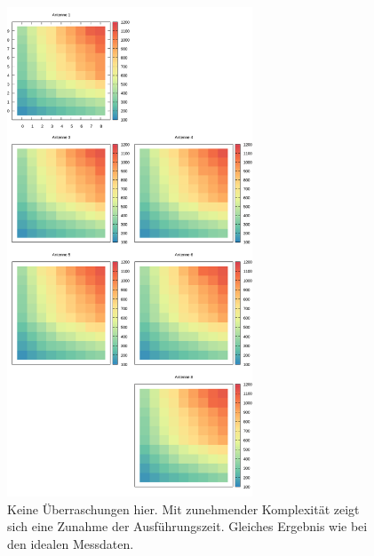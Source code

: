 \begin{figure}[!ht]
	\centering
	\caption[Performance Ergebnisse -- Reale Messwerte]{ Keine Überraschungen hier. Mit zunehmender Komplexität zeigt sich eine Zunahme der Ausführungszeit. Gleiches Ergebnis wie bei den idealen Messdaten. }
	\label{fig:results7}
	\vspace{3mm}
	\includegraphics[width=0.65\textwidth]{img/resultstimingreal.png}
\end{figure}
%